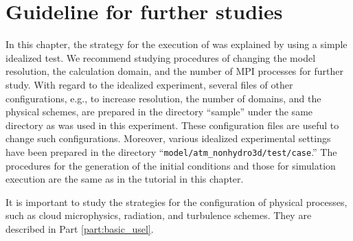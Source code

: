 \section{Guideline for further studies} \label{sec:ideal_exp_last}

In this chapter,
the strategy for the execution of \scaledg was explained by using a simple idealized test. 
We recommend studying procedures of changing the model resolution, 
the calculation domain, and the number of MPI processes for further study. 
With regard to the idealized experiment, several files of other configurations, 
e.g., to increase resolution, the number of domains, and the physical schemes, are prepared in the directory ``sample'' under the same directory as was used in this experiment. 
These configuration files are useful to change such configurations.  
Moreover, various idealized experimental settings  have been prepared in the directory ``\verb|model/atm_nonhydro3d/test/case|.'' 
The procedures for the generation of the initial conditions and those for simulation execution are the same as in the tutorial in this chapter.

It is important to study the strategies for the configuration of physical processes, such as cloud microphysics, radiation, and turbulence schemes. 
They are described in Part \ref{part:basic_usel}.

